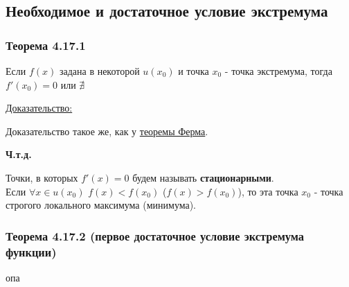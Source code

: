 \documentclass[12pt]{article}
\begin{document}
    \subsection{Необходимое и достаточное условие экстремума}
    \subsubsection*{Теорема 4.17.1}\label{th:4.17.1}
    Если $f(x)$ задана в некоторой $u(x_0)$ и точка $x_0$ - точка экстремума, тогда $f'(x_0) = 0$ или $\nexists$\par\noindent
    \underline{Доказательство:}
    \begin{adjustwidth}{1.5em}{1.5em}
        Доказательство такое же, как у \hyperref[th:4.12.1]{теоремы Ферма}.
        \begin{center}
            \textbf{Ч.т.д.}
        \end{center}
    \end{adjustwidth}
    Точки, в которых $f'(x) = 0$ будем называть \textbf{стационарными}.\\
    Если $\forall x \in u(x_0)$ $f(x) < f(x_0)$ ($f(x) > f(x_0)$), то эта точка $x_0$ - точка строгого локального максимума (минимума).
    \subsubsection*{Теорема 4.17.2 (первое достаточное условие экстремума функции)}\label{th:4.17.2}
    опа\par\noindent
    
\end{document}
